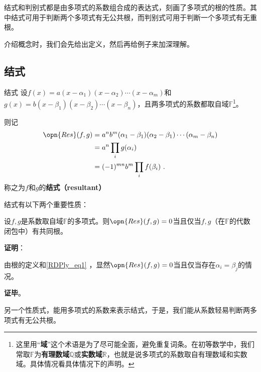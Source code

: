 

结式和判别式都是由多项式的系数组合成的表达式，刻画了多项式的根的性质。其中结式可用于判断两个多项式有无公共根，而判别式可用于判断一个多项式有无重根。

介绍概念时，我们会先给出定义，然后再给例子来加深理解。

\subsection{结式}

\begin{definition}{结式}
设$f(x)=a(x-\alpha_1)(x-\alpha_2)\cdots(x-\alpha_m)$和$g(x)=b(x-\beta_1)(x-\beta_2)\cdots(x-\beta_n)$，且两多项式的系数都取自域$\mathbb{F}$\footnote{这里用“\textbf{域}”这个术语是为了尽可能全面，避免重复词条。在初等数学中，我们常取$\mathbb{F}$为\textbf{有理数域}$\mathbb{Q}$或\textbf{实数域}$\mathbb{R}$，也就是说多项式的系数取自有理数域和实数域。具体情况看具体情况下的声明。}。

则记
\begin{equation}\label{RDPly_eq1}
\begin{aligned}
\opn{Res}(f, g)&=a^nb^m(\alpha_1-\beta_1)(\alpha_2-\beta_1)\cdots(\alpha_m-\beta_n)\\
&=a^n\prod_{i} g(\alpha_i)\\
&=(-1)^{mn}b^m\prod_{i} f(\beta_i)~.
\end{aligned}
\end{equation}
称之为$f$和$g$的\textbf{结式（resultant）}

\end{definition}

结式有以下两个重要性质：

\begin{theorem}{}
设$f, g$是系数取自域$\mathbb{F}$的多项式。则$\opn{Res}(f, g)=0$当且仅当$f, g$（在$\mathbb{F}$的代数闭包中）有共同根。
\end{theorem}

\textbf{证明}：

由根的定义和\autoref{RDPly_eq1} ，显然$\opn{Res}(f, g)=0$当且仅当存在$\alpha_i=\beta_j$的情况。

\textbf{证毕}。


另一个性质式，能用多项式的系数来表示结式，于是，我们能从系数轻易判断两多项式有无公共根。



